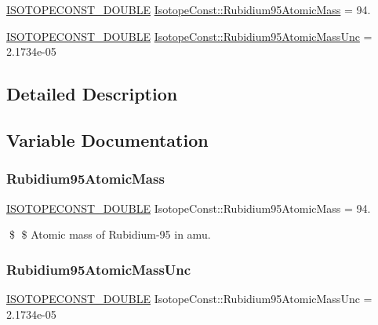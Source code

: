 \begin{DoxyCompactItemize}
\item 
\mbox{\hyperlink{group___isotope_const-_macros_ga8f45a7272ce02c0b4c65c44636ed719a}{I\+S\+O\+T\+O\+P\+E\+C\+O\+N\+S\+T\+\_\+\+D\+O\+U\+B\+LE}} \mbox{\hyperlink{group___isotope_const-_rubidium-_rb95_ga723d4c29d9ee14d8a73bbe114e2a96f2}{Isotope\+Const\+::\+Rubidium95\+Atomic\+Mass}} = 94.
\item 
\mbox{\hyperlink{group___isotope_const-_macros_ga8f45a7272ce02c0b4c65c44636ed719a}{I\+S\+O\+T\+O\+P\+E\+C\+O\+N\+S\+T\+\_\+\+D\+O\+U\+B\+LE}} \mbox{\hyperlink{group___isotope_const-_rubidium-_rb95_ga34d01b486e8e8e3cf797b32cedfe1837}{Isotope\+Const\+::\+Rubidium95\+Atomic\+Mass\+Unc}} = 2.\+1734e-\/05
\end{DoxyCompactItemize}


\subsection{Detailed Description}


\subsection{Variable Documentation}
\mbox{\label{group___isotope_const-_rubidium-_rb95_ga723d4c29d9ee14d8a73bbe114e2a96f2}} 
\subsubsection{\texorpdfstring{Rubidium95\+Atomic\+Mass}{Rubidium95AtomicMass}}
{\footnotesize\ttfamily \mbox{\hyperlink{group___isotope_const-_macros_ga8f45a7272ce02c0b4c65c44636ed719a}{I\+S\+O\+T\+O\+P\+E\+C\+O\+N\+S\+T\+\_\+\+D\+O\+U\+B\+LE}} Isotope\+Const\+::\+Rubidium95\+Atomic\+Mass = 94.}

\$ \$ Atomic mass of Rubidium-\/95 in amu. \mbox{\label{group___isotope_const-_rubidium-_rb95_ga34d01b486e8e8e3cf797b32cedfe1837}} 
\subsubsection{\texorpdfstring{Rubidium95\+Atomic\+Mass\+Unc}{Rubidium95AtomicMassUnc}}
{\footnotesize\ttfamily \mbox{\hyperlink{group___isotope_const-_macros_ga8f45a7272ce02c0b4c65c44636ed719a}{I\+S\+O\+T\+O\+P\+E\+C\+O\+N\+S\+T\+\_\+\+D\+O\+U\+B\+LE}} Isotope\+Const\+::\+Rubidium95\+Atomic\+Mass\+Unc = 2.\+1734e-\/05}

